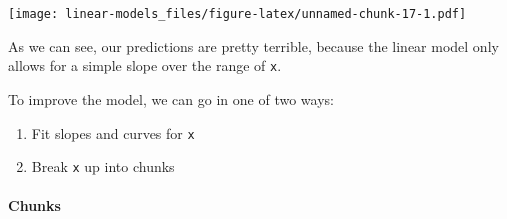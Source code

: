 \documentclass[]{article}
\newenvironment{Shaded}{\begin{snugshade}}{\end{snugshade}}
\newcommand{\DataTypeTok}[1]{\textcolor[rgb]{0.13,0.29,0.53}{#1}}
\newcommand{\DecValTok}[1]{\textcolor[rgb]{0.00,0.00,0.81}{#1}}
\newcommand{\KeywordTok}[1]{\textcolor[rgb]{0.13,0.29,0.53}{\textbf{#1}}}
\newcommand{\NormalTok}[1]{#1}
\newcommand{\OperatorTok}[1]{\textcolor[rgb]{0.81,0.36,0.00}{\textbf{#1}}}
\newcommand{\StringTok}[1]{\textcolor[rgb]{0.31,0.60,0.02}{#1}}
\providecommand{\tightlist}{%
  \setlength{\itemsep}{0pt}\setlength{\parskip}{0pt}}
\let\oldparagraph\paragraph
\renewcommand{\paragraph}[1]{\oldparagraph{#1}\mbox{}}
\begin{document}
\begin{Shaded}
\end{Shaded}

\texttt{[image: linear-models\_files/figure-latex/unnamed-chunk-17-1.pdf]}

As we can see, our predictions are pretty terrible, because the linear model
only allows for a simple slope over the range of \texttt{x}.

To improve the model, we can go in one of two ways:

\begin{enumerate}
\def\labelenumi{\arabic{enumi}.}
\tightlist
\item
  Fit slopes and curves for \texttt{x}
\item
  Break \texttt{x} up into chunks
\end{enumerate}

\hypertarget{chunks}{%
\paragraph{Chunks}\label{chunks}}
\end{document}
